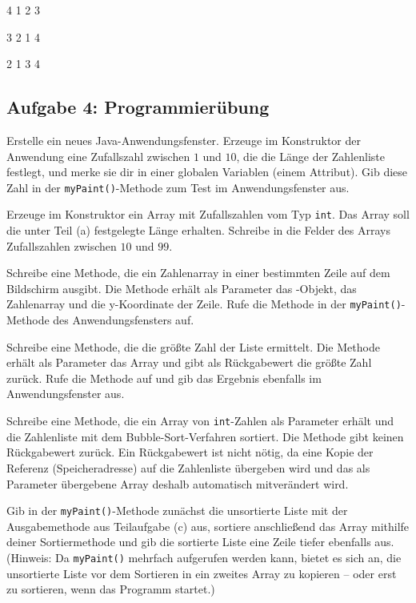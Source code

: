 \begin{compactenum}[a)]
\item 4  1  2  3
\item 3  2  1  4
\item 2  1  3  4
\end{compactenum}


\subsection{Aufgabe 4: Programmierübung}

\begin{compactenum}[a)]
\item Erstelle ein neues Java-Anwendungsfenster. Erzeuge im Konstruktor der
Anwendung eine Zufallszahl zwischen $1$ und $10$, die die Länge der
Zahlenliste festlegt, und merke sie dir in einer globalen Variablen (einem
Attribut). Gib diese Zahl in der \lstinline|myPaint()|-Methode zum Test im
Anwendungsfenster aus.

\item Erzeuge im Konstruktor ein Array mit Zufallszahlen vom Typ \lstinline|int|. Das
Array soll die unter Teil (a) festgelegte Länge erhalten. Schreibe in die Felder des
Arrays Zufallszahlen zwischen $10$ und $99$.

\item Schreibe eine Methode, die ein Zahlenarray in einer bestimmten Zeile auf
dem Bildschirm ausgibt. Die Methode erhält als Parameter das
-Objekt, das Zahlenarray und die y-Koordinate der Zeile.
Rufe die Methode in der \lstinline|myPaint()|-Methode des Anwendungsfensters
auf.

\item Schreibe eine Methode, die die größte Zahl der Liste ermittelt. Die
Methode erhält als Parameter das Array und gibt als Rückgabewert die größte
Zahl zurück. Rufe die Methode auf und gib das Ergebnis ebenfalls im
Anwendungsfenster aus.

\item Schreibe eine Methode, die ein Array von \lstinline|int|-Zahlen als Parameter
erhält und die Zahlenliste mit dem Bubble-Sort-Verfahren sortiert. Die Methode
gibt keinen Rückgabewert zurück. Ein Rückgabewert ist nicht nötig, da eine
Kopie der Referenz (Speicheradresse) auf die Zahlenliste übergeben wird und
das als Parameter übergebene Array deshalb automatisch mitverändert wird.

Gib in der \lstinline|myPaint()|-Methode zunächst die unsortierte Liste mit
der Ausgabemethode aus Teilaufgabe (c) aus, sortiere anschließend das Array
mithilfe deiner Sortiermethode und gib die sortierte Liste eine Zeile tiefer
ebenfalls aus. (Hinweis: Da \lstinline|myPaint()| mehrfach aufgerufen werden
kann, bietet es sich an, die unsortierte Liste vor dem Sortieren in ein zweites
Array zu kopieren -- oder erst zu sortieren, wenn das Programm startet.)
\end{compactenum}

